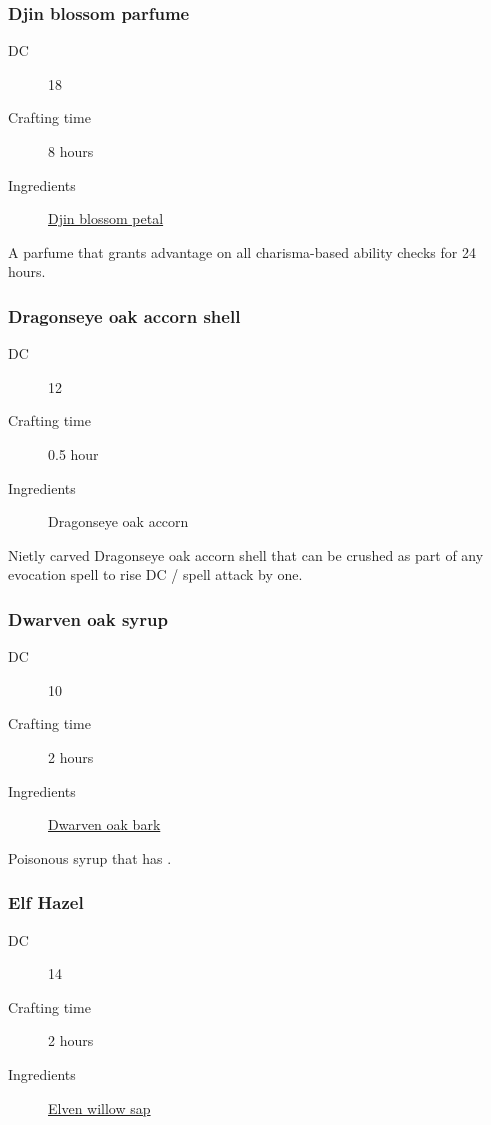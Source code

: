 \subsubsection{Djin blossom parfume}

\begin{description}
\item [DC] 18
\item [Crafting time] 8 hours
\item [Ingredients] \hyperref[Djin Blossom]{Djin blossom petal}
\end{description}

A parfume that grants advantage on all charisma-based ability checks for 24 hours.

\subsubsection{Dragonseye oak accorn shell}
\label{Dragonseye oak accorn shell}

\begin{description}
\item [DC] 12
\item [Crafting time] 0.5 hour
\item [Ingredients] Dragonseye oak accorn
\end{description}

Nietly carved Dragonseye oak accorn shell that can be crushed as part of any evocation spell to rise DC / spell attack by one.

\subsubsection{Dwarven oak syrup}
\label{Dwarven oak syrup}

\begin{description}
\item [DC] 10
\item [Crafting time] 2 hours
\item [Ingredients] \hyperref[Dwarven Oak]{Dwarven oak bark}
\end{description}

Poisonous syrup that has \poison\poison\poison.

\subsubsection{Elf Hazel}
\label{Elf Hazel}

\begin{description}
\item [DC] 14
\item [Crafting time] 2 hours
\item [Ingredients] \hyperref[Elven Willow]{Elven willow sap}
\end{description}

